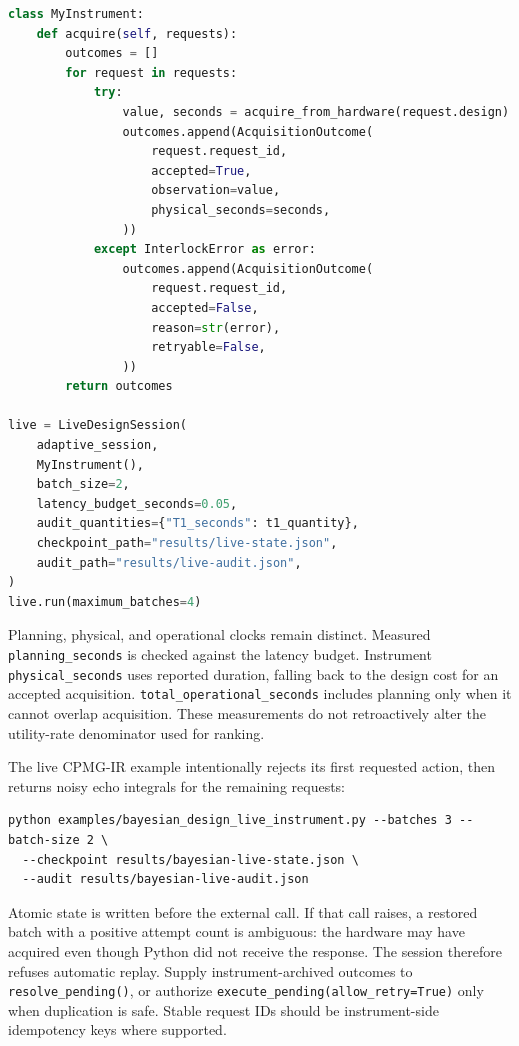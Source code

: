 \documentclass[11pt,oneside]{report}
\newcommand{\code}[1]{\texttt{#1}}
\begin{document}
\begin{lstlisting}[language=Python]
class MyInstrument:
    def acquire(self, requests):
        outcomes = []
        for request in requests:
            try:
                value, seconds = acquire_from_hardware(request.design)
                outcomes.append(AcquisitionOutcome(
                    request.request_id,
                    accepted=True,
                    observation=value,
                    physical_seconds=seconds,
                ))
            except InterlockError as error:
                outcomes.append(AcquisitionOutcome(
                    request.request_id,
                    accepted=False,
                    reason=str(error),
                    retryable=False,
                ))
        return outcomes

live = LiveDesignSession(
    adaptive_session,
    MyInstrument(),
    batch_size=2,
    latency_budget_seconds=0.05,
    audit_quantities={"T1_seconds": t1_quantity},
    checkpoint_path="results/live-state.json",
    audit_path="results/live-audit.json",
)
live.run(maximum_batches=4)
\end{lstlisting}

Planning, physical, and operational clocks remain distinct. Measured
\code{planning\_seconds} is checked against the latency budget. Instrument
\code{physical\_seconds} uses reported duration, falling back to the design
cost for an accepted acquisition. \code{total\_operational\_seconds} includes
planning only when it cannot overlap acquisition. These measurements do not
retroactively alter the utility-rate denominator used for ranking.

The live CPMG-IR example intentionally rejects its first requested action, then
returns noisy echo integrals for the remaining requests:

\begin{lstlisting}
python examples/bayesian_design_live_instrument.py --batches 3 --batch-size 2 \
  --checkpoint results/bayesian-live-state.json \
  --audit results/bayesian-live-audit.json
\end{lstlisting}

Atomic state is written before the external call. If that call raises, a
restored batch with a positive attempt count is ambiguous: the hardware may
have acquired even though Python did not receive the response. The session
therefore refuses automatic replay. Supply instrument-archived outcomes to
\code{resolve\_pending()}, or authorize
\code{execute\_pending(allow\_retry=True)} only when duplication is safe.
Stable request IDs should be instrument-side idempotency keys where supported.
\end{document}
